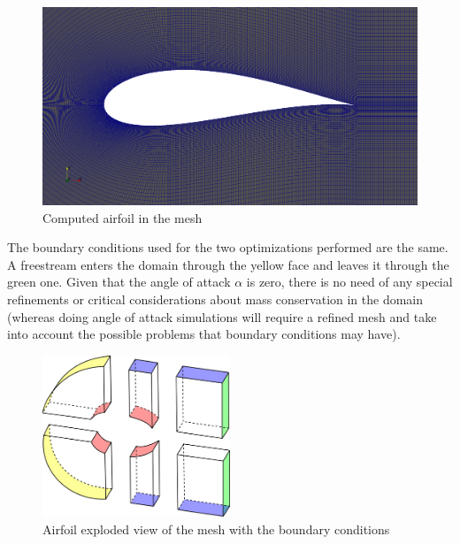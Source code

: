      \begin{figure}[h!]
        \centering
        \includegraphics[width=\textwidth]{Figures/3/joukFoil.png}
        \caption{Computed airfoil in the mesh}
        \label{fig:computedJoukowsky}
    \end{figure}
        
    The boundary conditions used for the two optimizations performed are the same. A freestream enters the domain through the yellow face and leaves it through the green one. Given that the angle of attack $\alpha$ is zero, there is no need of any special refinements or critical considerations about mass conservation in the domain (whereas doing angle of attack simulations will require a refined mesh and take into account the possible problems that boundary conditions may have). 

    \vspace{3mm}    
    
     \begin{figure}[h!]
        \centering
        \small
        \includegraphics[width=0.5\textwidth]{Figures/3/airfoilBC.png}
        \caption{Airfoil exploded view of the mesh with the boundary conditions}
        \label{fig:airofilBCpic}
    \end{figure}
    

